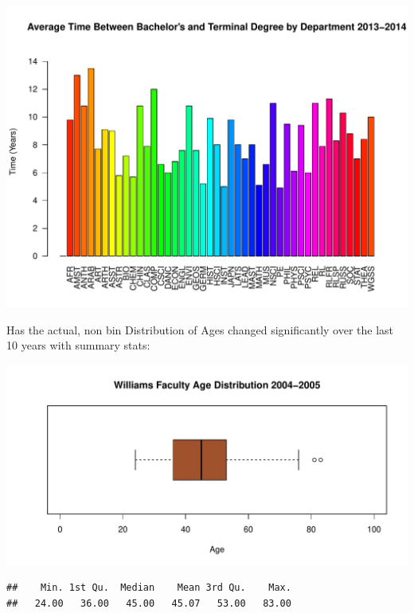 \documentclass[12pt,a4paper]{article}\usepackage[]{graphicx}\usepackage[]{color}
\makeatletter
\def\maxwidth{ %
  \ifdim\Gin@nat@width>\linewidth
    \linewidth
  \else
    \Gin@nat@width
  \fi
}
\newenvironment{kframe}{%
 \def\at@end@of@kframe{}%
 \ifinner\ifhmode%
  \def\at@end@of@kframe{\end{minipage}}%
  \begin{minipage}{\columnwidth}%
 \fi\fi%
 \def\FrameCommand##1{\hskip\@totalleftmargin \hskip-\fboxsep
 \colorbox{shadecolor}{##1}\hskip-\fboxsep
     \hskip-\linewidth \hskip-\@totalleftmargin \hskip\columnwidth}%
 \MakeFramed {\advance\hsize-\width
   \@totalleftmargin\z@ \linewidth\hsize
   \@setminipage}}%
 {\par\unskip\endMakeFramed%
 \at@end@of@kframe}
\newenvironment{knitrout}{}{} %
\theoremstyle{definition}
\makeatother
\begin{document}
\begin{knitrout}
\includegraphics[width=\maxwidth]{figure/unnamed-chunk-13-10} 

\end{knitrout}

\bigskip
Has the actual, non bin Distribution of Ages changed significantly over the last 10 years with summary stats:

\begin{knitrout}
\color{fgcolor}
\includegraphics[width=\maxwidth]{figure/unnamed-chunk-14-1} 

\end{knitrout}

\begin{knitrout}
\color{fgcolor}\begin{kframe}
\begin{verbatim}
##    Min. 1st Qu.  Median    Mean 3rd Qu.    Max. 
##   24.00   36.00   45.00   45.07   53.00   83.00
\end{verbatim}
\end{kframe}
\end{knitrout}
\end{document}
